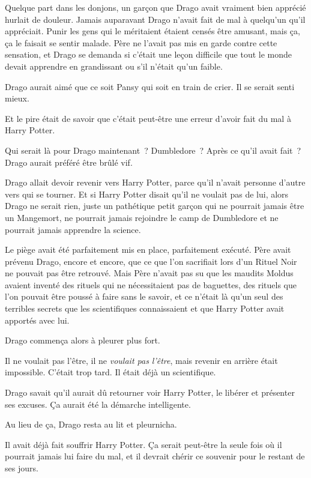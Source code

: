 Quelque part dans les donjons, un garçon que Drago avait vraiment bien apprécié hurlait de douleur. Jamais auparavant Drago n'avait fait de mal à quelqu'un qu'il appréciait. Punir les gens qui le méritaient étaient censés être amusant, mais ça, ça le faisait se sentir malade. Père ne l'avait pas mis en garde contre cette sensation, et Drago se demanda si c'était une leçon difficile que tout le monde devait apprendre en grandissant ou s'il n'était qu'un faible.

Drago aurait aimé que ce soit Pansy qui soit en train de crier. Il se serait senti mieux.

Et le pire était de savoir que c'était peut-être une erreur d'avoir fait du mal à Harry Potter.

Qui serait là pour Drago maintenant~? Dumbledore~? Après ce qu'il avait fait~? Drago aurait préféré être brûlé vif.

Drago allait devoir revenir vers Harry Potter, parce qu'il n'avait personne d'autre vers qui se tourner. Et si Harry Potter disait qu'il ne voulait pas de lui, alors Drago ne serait rien, juste un pathétique petit garçon qui ne pourrait jamais être un Mangemort, ne pourrait jamais rejoindre le camp de Dumbledore et ne pourrait jamais apprendre la science.

Le piège avait été parfaitement mis en place, parfaitement exécuté. Père avait prévenu Drago, encore et encore, que ce que l'on sacrifiait lors d'un Rituel Noir ne pouvait pas être retrouvé. Mais Père n'avait pas su que les maudits Moldus avaient inventé des rituels qui ne nécessitaient pas de baguettes, des rituels que l'on pouvait être poussé à faire sans le savoir, et ce n'était là qu'un seul des terribles secrets que les scientifiques connaissaient et que Harry Potter avait apportés avec lui.

Drago commença alors à pleurer plus fort.

Il ne voulait pas l'être, il ne \emph{voulait pas l'être}, mais revenir en arrière était impossible. C'était trop tard. Il était déjà un scientifique.

Drago savait qu'il aurait dû retourner voir Harry Potter, le libérer et présenter ses excuses. Ça aurait été la démarche intelligente.

Au lieu de ça, Drago resta au lit et pleurnicha.

Il avait déjà fait souffrir Harry Potter. Ça serait peut-être la seule fois où il pourrait jamais lui faire du mal, et il devrait chérir ce souvenir pour le restant de ses jours.

